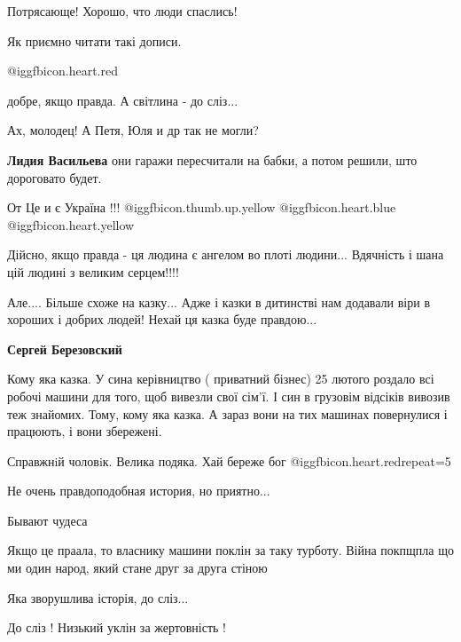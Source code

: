 \begin{itemize}
Потрясающе! Хорошо, что люди спаслись!

Як приємно читати такі дописи.

@igg{fbicon.heart.red}

добре, якщо правда. А світлина - до сліз...

Ах, молодец! А Петя, Юля и др так не могли?

\textbf{Лидия Васильева} они гаражи пересчитали на бабки, а потом решили, што дороговато будет.

От Це и є Україна !!!  @igg{fbicon.thumb.up.yellow}  @igg{fbicon.heart.blue}  @igg{fbicon.heart.yellow} 

Дійсно, якщо правда - ця людина є ангелом во плоті людини... Вдячність і шана цій людині з великим серцем!!!!


Але.... Більше схоже на казку... Адже і казки в дитинстві нам додавали віри в
хороших і добрих людей! Нехай ця казка буде правдою...

\begin{itemize} %
\textbf{Сергей Березовский} 

Кому яка казка. У сина керівництво ( приватний бізнес) 25 лютого роздало всі
робочі машини для того, щоб вивезли свої сім'ї. І син в грузовім відсіків
вивозив теж знайомих. Тому, кому яка казка. А зараз вони на тих машинах
повернулися і працюють, і вони збережені.

\end{itemize} %


Справжнiй чоловiк. Велика подяка. Хай береже бог
@igg{fbicon.heart.red}{repeat=5}

Не очень правдоподобная история, но приятно...

Бывают чудеса


Якщо це праала, то власнику машини поклін за таку турботу. Війна покпщпла що ми
один народ, який стане друг за друга стіною

Яка зворушлива історія, до сліз...

До сліз ! Низький уклін за жертовність !


\end{itemize}
